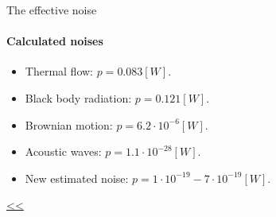 \documentclass{beamer}
\begin{document}
\begin{frame}{\hypertarget{frame:The effective noise 1}{The effective noise}}
	\framesubtitle{Calculated noises}
	\begin{itemize}	
		\item Thermal flow: $p=0.083[W]$.
		\item Black body radiation: $p=0.121[W]$.
		\item Brownian motion: $p=6.2\cdot 10^{-6}[W]$.
		\item Acoustic waves: $p=1.1\cdot 10^{-28}[W]$.
		\item New estimated noise: $p=1\cdot 10^{-19} - 7\cdot 10^{-19}[W]$.
					
	\end{itemize}
	\hyperlink{frame:The effective noise}{<<} 
\end{frame}
\end{document}
